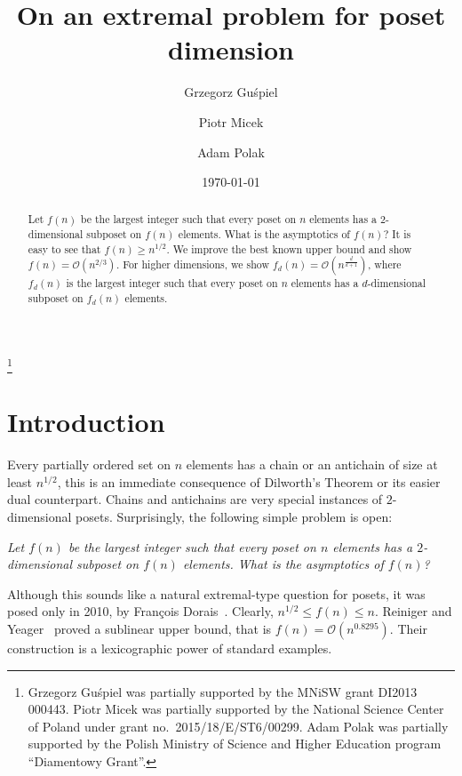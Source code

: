 \documentclass[a4paper,reqno,12pt]{amsart}
\theoremstyle{remark}
\theoremstyle{plain}
\theoremstyle{definition}
\renewcommand{\O}{\mathcal{O}}
\let\leq\leqslant
\let\geq\geqslant
\begin{document}
\title[]{On an extremal problem for poset dimension}


\author[G.~Guśpiel]{Grzegorz Guśpiel}
\author[P.~Micek]{Piotr Micek}
\author[A.~Polak]{Adam Polak}
\address[G.~Guśpiel, A.~Polak, P.~Micek]{Theoretical Computer Science Department\\
	Faculty of Mathematics and Computer Science, Jagiellonian University, Krak\'ow, Poland}

\thanks{
  Grzegorz Guśpiel was partially supported by the MNiSW grant DI2013 000443.
  Piotr Micek was partially supported by the National Science Center of Poland under grant no.\ 2015/18/E/ST6/00299.
  Adam Polak was partially supported by the Polish Ministry of Science and Higher Education program ``Diamentowy Grant''.
}

\date{\today}

\begin{abstract}
Let $f(n)$ be the largest integer such that every poset on $n$ elements has a $2$-dimensional subposet on $f(n)$ elements.
What is the asymptotics of $f(n)$?
It is easy to see that $f(n)\geq n^{1/2}$.
We improve the best known upper bound and show $f(n)=\O(n^{2/3})$.
For higher dimensions, we show $f_d(n)=\O\left(n^\frac{d}{d+1}\right)$, where
$f_d(n)$ is the largest integer such that every poset on $n$ elements has
a $d$-dimensional subposet on $f_d(n)$ elements.
\end{abstract}

\maketitle

\section{Introduction}

Every partially ordered set on $n$ elements has a chain or an antichain of size at least $n^{1/2}$,
this is an immediate consequence of Dilworth's Theorem or its easier dual counterpart.
Chains and antichains are very special instances of $2$-dimensional posets.
Surprisingly, the following simple problem is open:

{\it
Let $f(n)$ be the largest integer such that every poset on $n$ elements has a $2$-dimensional subposet on $f(n)$ elements.
What is the asymptotics of $f(n)$?
}

Although this sounds like a natural extremal-type question for posets,
it was posed only in 2010, by François Dorais~\cite{Dorais2010}.
Clearly, $n^{1/2} \leq f(n) \leq n$.
Reiniger and Yeager~\cite{Reiniger2016} proved a sublinear upper bound, that is
$f(n)=\O(n^{0.8295})$.
Their construction is a lexicographic power of standard examples.
\end{document}
